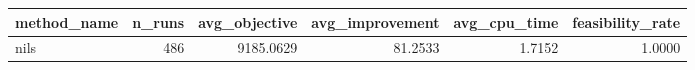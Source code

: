 \begin{tabular}{lrrrrr}
\toprule
method_name & n_runs & avg_objective & avg_improvement & avg_cpu_time & feasibility_rate \\
\midrule
nils & 486 & 9185.0629 & 81.2533 & 1.7152 & 1.0000 \\
\bottomrule
\end{tabular}
